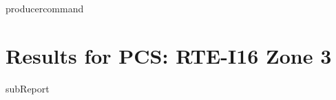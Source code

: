 {{ producercommand }}




    \section{Results for PCS: RTE-I16 Zone 3}

    {{subReport}}
    \newpage

